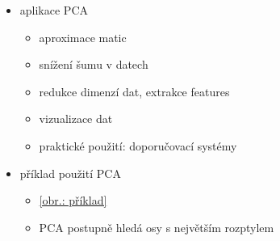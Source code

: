 \begin{itemize}
\begin{itemize}
\begin{itemize}
\end{itemize}
\item aplikace PCA
\begin{itemize}
\item aproximace matic
\item snížení šumu v datech
\item redukce dimenzí dat, extrakce features
\item vizualizace dat
\item praktické použití: doporučovací systémy
\end{itemize}
\item příklad použití PCA
\begin{itemize}
\item \href{https://towardsdatascience.com/pca-clearly-explained-how-when-why-to-use-it-and-feature-importance-a-guide-in-python-7c274582c37e/}{[obr.: příklad]}
\item PCA postupně hledá osy s největším rozptylem
\end{itemize}
\end{itemize}
\end{itemize}
